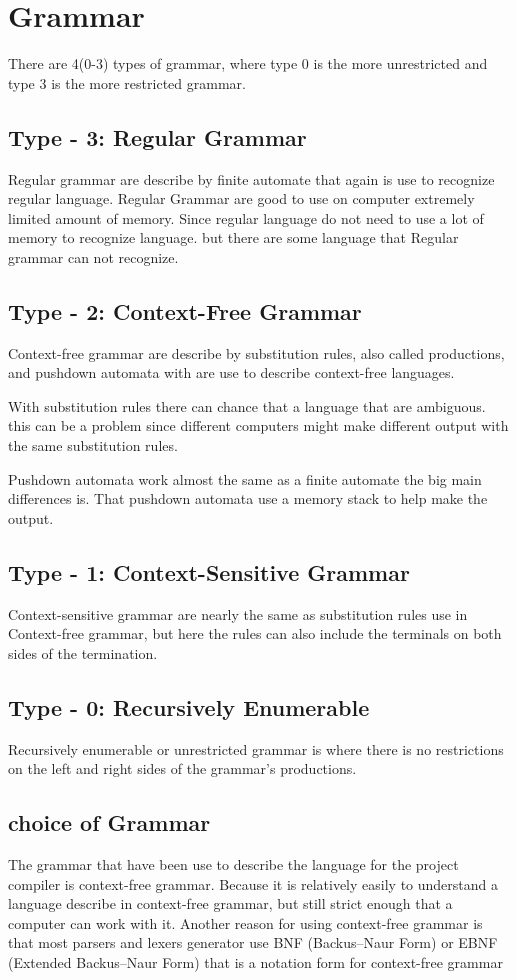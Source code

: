 \section{Grammar}
There are 4(0-3) types of grammar, where type 0 is the more unrestricted and type 3 is the more restricted grammar.

\subsection{Type - 3: Regular Grammar}
Regular grammar are describe by finite automate that again is use to recognize regular language. Regular Grammar are good to use on computer extremely limited amount of memory. Since regular language do not need to use a lot of memory to recognize language. but there are some language that Regular grammar can not recognize.

\subsection{Type - 2: Context-Free Grammar}
Context-free grammar are describe by substitution rules, also called productions, and pushdown automata with are use to describe context-free languages.

With substitution rules there can chance that a language that are ambiguous. this can be a problem since different computers might make different output with the same substitution rules.

Pushdown automata work almost the same as a finite automate the big main differences is. That pushdown automata use a memory stack to help make the output.

\subsection{Type - 1: Context-Sensitive Grammar}
Context-sensitive grammar are nearly the same as substitution rules use in Context-free grammar, but here the rules can also include the terminals on both sides of the termination.

\subsection{Type - 0: Recursively Enumerable}
Recursively enumerable or unrestricted grammar is where there is no restrictions on the left and right sides of the grammar's productions.

\subsection{choice of Grammar}
The grammar that have been use to describe the language for the  project compiler is context-free grammar. Because it is relatively easily to understand a language describe in context-free grammar, but still strict enough that a computer can work with it. Another reason for using context-free grammar is that most parsers and lexers generator use BNF (Backus–Naur Form) or EBNF (Extended Backus–Naur Form) that is a notation form for context-free grammar